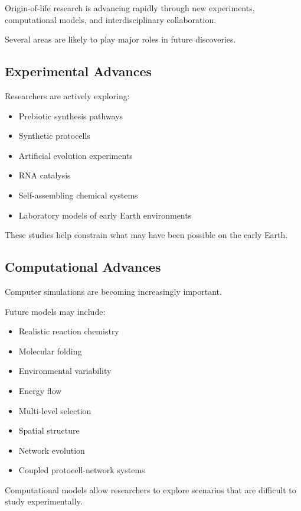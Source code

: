 \documentclass[
  oneside,
  openany]{book}
\providecommand{\tightlist}{%
  \setlength{\itemsep}{0pt}\setlength{\parskip}{0pt}}
\begin{document}
Origin-of-life research is advancing rapidly through new experiments, computational models, and interdisciplinary collaboration.

Several areas are likely to play major roles in future discoveries.

\subsection{Experimental Advances}\label{experimental-advances}

Researchers are actively exploring:

\begin{itemize}
\tightlist
\item
  Prebiotic synthesis pathways
\item
  Synthetic protocells
\item
  Artificial evolution experiments
\item
  RNA catalysis
\item
  Self-assembling chemical systems
\item
  Laboratory models of early Earth environments
\end{itemize}

These studies help constrain what may have been possible on the early Earth.

\subsection{Computational Advances}\label{computational-advances}

Computer simulations are becoming increasingly important.

Future models may include:

\begin{itemize}
\tightlist
\item
  Realistic reaction chemistry
\item
  Molecular folding
\item
  Environmental variability
\item
  Energy flow
\item
  Multi-level selection
\item
  Spatial structure
\item
  Network evolution
\item
  Coupled protocell-network systems
\end{itemize}

Computational models allow researchers to explore scenarios that are difficult to study experimentally.
\end{document}
